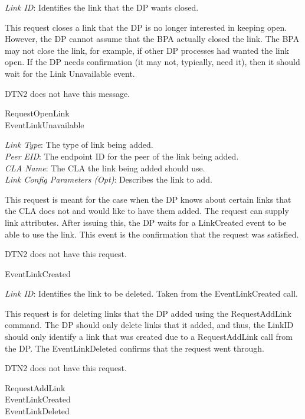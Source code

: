 {
\metP
    {\em Link ID}: Identifies the link that the DP wants closed.

\metD
    This request closes a link that the DP is no longer interested in
    keeping open. However, the DP cannot assume that the BPA actually closed
    the link. The BPA may not close the link, for example, if other
    DP processes had wanted the link open. If the DP needs confirmation
    (it may not, typically, need it), then it should wait for the
    Link Unavailable event.

\metM
    DTN2 does not have this message.

\metR
    RequestOpenLink\\
    EventLinkUnavailable

}

{
\metP
    {\em Link Type}: The type of link being added.\\
    {\em Peer EID}: The endpoint ID for the peer of the link being added.\\
    {\em CLA Name}: The CLA the link being added should use.\\
    {\em Link Config Parameters (Opt)}: Describes the link to add. 

\metD
    This request is meant for the case when the DP knows about certain links
    that the CLA does not and would like to have them
    added. The request can supply link attributes. After issuing this,
    the DP waits for a LinkCreated event to be able to use the link. This
    event is the confirmation that the request was satisfied.

\metM
    DTN2 does not have this request.

\metR
    EventLinkCreated
}

{
\metP
    {\em Link ID}: Identifies the link to be deleted. Taken from the
    EventLinkCreated call.

\metD
    This request is for deleting links that the DP added using the
    RequestAddLink command. The DP should only delete links that it added,
    and thus, the LinkID should only identify a link that was created
    due to a RequestAddLink call from the DP. The EventLinkDeleted confirms
    that the request went through.

\metM
    DTN2 does not have this request.

\metR
    RequestAddLink \\
    EventLinkCreated \\
    EventLinkDeleted
}
    
